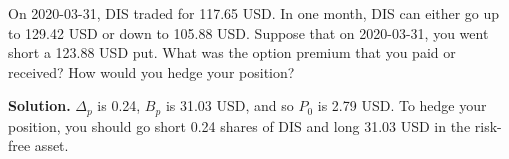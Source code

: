 \noindent On 2020-03-31, DIS traded for 117.65 USD. In one month, DIS can either go up to 129.42 USD or down to 105.88 USD. Suppose that on 2020-03-31, you went short a 123.88 USD put. What was the option premium that you paid or received? How would you hedge your position?

\vspace{9pt}

\noindent\textbf{Solution.} $\Delta_{p}$ is 0.24, $B_{p}$ is 31.03 USD, and so $P_{0}$ is 2.79 USD. To hedge your position, you should go short 0.24 shares of DIS and long 31.03 USD in the risk-free asset.